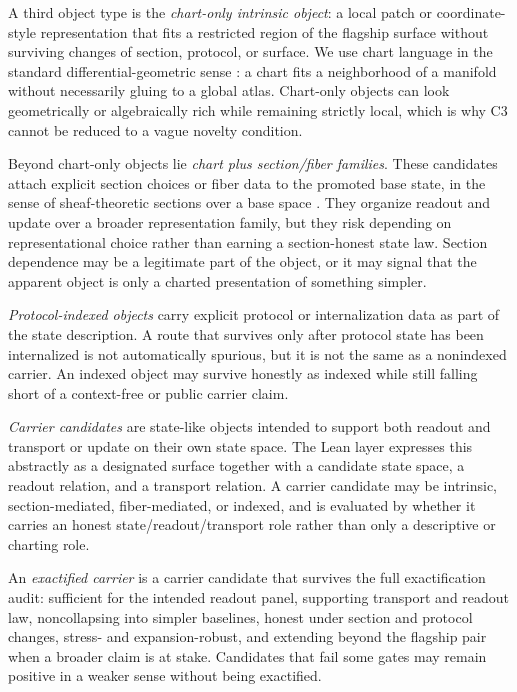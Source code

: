 \documentclass[11pt]{article}
\theoremstyle{definition}
\begin{document}
A third object type is the \emph{chart-only intrinsic object}: a local patch or
coordinate-style representation that fits a restricted region of the flagship surface
without surviving changes of section, protocol, or surface. We use chart language in
the standard differential-geometric sense \citep{Lee2013}: a chart fits a neighborhood
of a manifold without necessarily gluing to a global atlas. Chart-only objects can
look geometrically or algebraically rich while remaining strictly local, which is why
C3 cannot be reduced to a vague novelty condition.

Beyond chart-only objects lie \emph{chart plus section/fiber families}. These candidates
attach explicit section choices or fiber data to the promoted base state, in the
sense of sheaf-theoretic sections over a base space \citep{MacLaneMoerdijk1992}. They
organize readout and update over a broader representation family, but they risk
depending on representational choice rather than earning a section-honest state law. Section
dependence may be a legitimate part of the object, or it may signal that the apparent
object is only a charted presentation of something simpler.

\emph{Protocol-indexed objects} carry explicit protocol or internalization data as part
of the state description. A route that survives only after protocol state has been
internalized is not automatically spurious, but it is not the same as a nonindexed
carrier. An indexed object may survive honestly as indexed while still falling short of
a context-free or public carrier claim.

\emph{Carrier candidates} are state-like objects intended to support both readout and
transport or update on their own state space. The Lean layer expresses this abstractly
as a designated surface together with a candidate state space, a readout relation, and
a transport relation. A carrier candidate may be intrinsic, section-mediated,
fiber-mediated, or indexed, and is evaluated by whether it carries an honest
state/readout/transport role rather than only a descriptive or charting role.

An \emph{exactified carrier} is a carrier candidate that survives the full
exactification audit: sufficient for the intended readout panel, supporting transport
and readout law, noncollapsing into simpler baselines, honest under section and protocol
changes, stress- and expansion-robust, and extending beyond the flagship pair when a
broader claim is at stake. Candidates that fail some gates may remain positive in a
weaker sense without being exactified.
\end{document}
